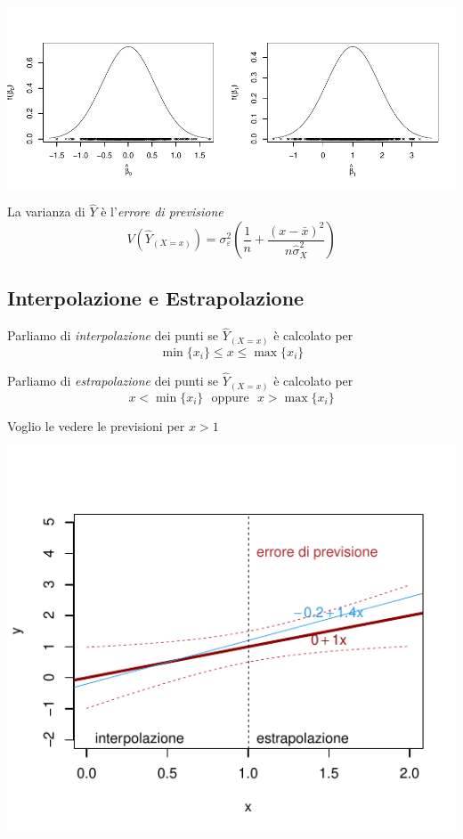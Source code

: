 \documentclass[
  11pt,
]{book}
\theoremstyle{mytheoremstyle}
\theoremstyle{mydefstyle}
\begin{document}
\begin{center}\includegraphics{Appunti_di_Statistica_2025_files/figure-latex/18-regressione-II-6-1} \end{center}

La varianza di \(\hat Y\) è l'\emph{errore di previsione}
\[V(\widehat{Y}_{(X=x)}) = \sigma_{\varepsilon}^{2} \left( \frac{1} {n}  +  \frac{(x - \bar{x})^{2}} {n \hat{\sigma}^{2}_{X}} \right)\]

\subsection{Interpolazione e Estrapolazione}\label{interpolazione-e-estrapolazione}

\begin{info}
Parliamo di \emph{interpolazione} dei punti se \(\hat Y_{(X=x)}\) è calcolato per
\[\min\{x_i\}\leq x \leq\max\{x_i\}\]

Parliamo di \emph{estrapolazione} dei punti se \(\hat Y_{(X=x)}\) è calcolato per
\[x<\min\{x_i\}~~~\text{oppure}~~~ x >\max\{x_i\}\]

\end{info}

Voglio le vedere le previsioni per \(x>1\)

\begin{center}\includegraphics{Appunti_di_Statistica_2025_files/figure-latex/18-regressione-II-8-1} \end{center}
\end{document}
